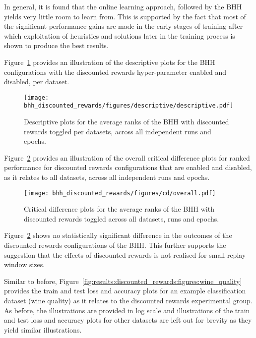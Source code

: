 In general, it is found that the online learning approach, followed by the \acs{BHH} yields very little room to learn from. This is supported by the fact that most of the significant performance gains are made in the early stages of training after which exploitation of heuristics and solutions later in the training process is shown to produce the best results.

Figure~\ref{fig:results:discounted_rewards:descriptive:descriptive} provides an illustration of the descriptive plots for the \acs{BHH} configurations with the discounted rewards hyper-parameter enabled and disabled, per dataset.

\begin{figure}[htb]
      \centering
      \texttt{[image: bhh\_discounted\_rewards/figures/descriptive/descriptive.pdf]}
      \caption{Descriptive plots for the average ranks of the \acs{BHH} with discounted rewards toggled per datasets, across all independent runs and epochs.}
      \label{fig:results:discounted_rewards:descriptive:descriptive}
\end{figure}

Figure~\ref{fig:results:discounted_rewards:descriptive:cd} provides an illustration of the overall critical difference plots for ranked performance for discounted rewards configurations that are enabled and disabled, as it relates to all datasets, across all independent runs and epochs.

\begin{figure}[htb]
      \centering
      \texttt{[image: bhh\_discounted\_rewards/figures/cd/overall.pdf]}
      \caption{Critical difference plots for the average ranks of the \acs{BHH} with discounted rewards toggled across all datasets, runs and epochs.}
      \label{fig:results:discounted_rewards:descriptive:cd}
\end{figure}

Figure~\ref{fig:results:discounted_rewards:descriptive:cd} shows no statistically significant difference in the outcomes of the discounted rewards configurations of the \acs{BHH}. This further supports the suggestion that the effects of discounted rewards is not realised for small replay window sizes.

Similar to before, Figure~\ref{fig:results:discounted_rewards:figures:wine_quality} provides the train and test loss and accuracy plots for an example classification dataset (wine quality) as it relates to the discounted rewards experimental group. As before, the illustrations are provided in log scale and illustrations of the train and test loss and accuracy plots for other datasets are left out for brevity as they yield similar illustrations.

